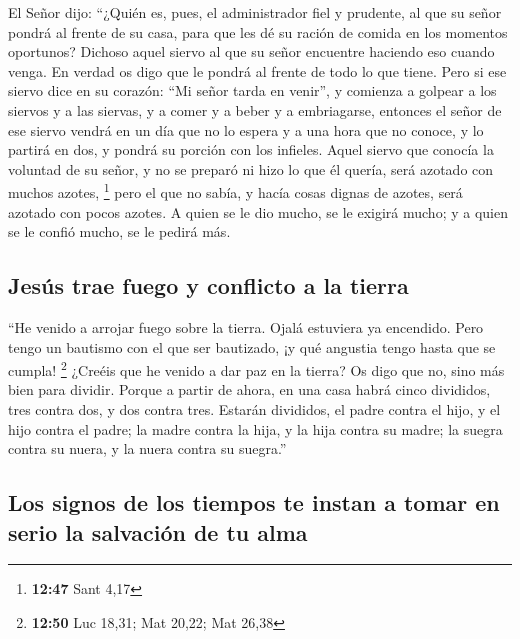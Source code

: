 \begin{paracol}{2}
 El Señor dijo: ``¿Quién es, pues, el administrador fiel
y prudente, al que su señor pondrá al frente de su casa, para que les dé
su ración de comida en los momentos oportunos?  Dichoso
aquel siervo al que su señor encuentre haciendo eso cuando venga.
 En verdad os digo que le pondrá al frente de todo lo que
tiene.  Pero si ese siervo dice en su corazón: ``Mi señor
tarda en venir'', y comienza a golpear a los siervos y a las siervas, y
a comer y a beber y a embriagarse,  entonces el señor de
ese siervo vendrá en un día que no lo espera y a una hora que no conoce,
y lo partirá en dos, y pondrá su porción con los infieles.
 Aquel siervo que conocía la voluntad de su señor, y no
se preparó ni hizo lo que él quería, será azotado con muchos azotes,
\footnote{\textbf{12:47} Sant 4,17}  pero el que no
sabía, y hacía cosas dignas de azotes, será azotado con pocos azotes. A
quien se le dio mucho, se le exigirá mucho; y a quien se le confió
mucho, se le pedirá más.

\hypertarget{jesuxfas-trae-fuego-y-conflicto-a-la-tierra}{%
\subsection{Jesús trae fuego y conflicto a la
tierra}\label{jesuxfas-trae-fuego-y-conflicto-a-la-tierra}}

 ``He venido a arrojar fuego sobre la tierra. Ojalá
estuviera ya encendido.  Pero tengo un bautismo con el
que ser bautizado, ¡y qué angustia tengo hasta que se cumpla!
\footnote{\textbf{12:50} Luc 18,31; Mat 20,22; Mat 26,38}
 ¿Creéis que he venido a dar paz en la tierra? Os digo
que no, sino más bien para dividir.  Porque a partir de
ahora, en una casa habrá cinco divididos, tres contra dos, y dos contra
tres.  Estarán divididos, el padre contra el hijo, y el
hijo contra el padre; la madre contra la hija, y la hija contra su
madre; la suegra contra su nuera, y la nuera contra su suegra.''

\hypertarget{los-signos-de-los-tiempos-te-instan-a-tomar-en-serio-la-salvaciuxf3n-de-tu-alma}{%
\subsection{Los signos de los tiempos te instan a tomar en serio la
salvación de tu
alma}\label{los-signos-de-los-tiempos-te-instan-a-tomar-en-serio-la-salvaciuxf3n-de-tu-alma}}


\end{paracol}
